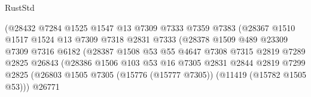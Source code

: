 \begin{lexlean}{RustStd}
\begin{coremodule}
                                    (@28432
                                      @7284
                                      @1525
                                      @1547
                                      @13
                                      @7309
                                      @7333
                                      @7359
                                      @7383
                                      (@28367
                                        @1510
                                        @1517
                                        @1524
                                        @13
                                        @7309
                                        @7318
                                        @2831
                                        @7333
                                        (@28378
                                          @1509
                                          @489
                                          @23309
                                          @7309
                                          @7316
                                          @6182
                                          (@28387
                                            @1508
                                            @53
                                            @55
                                            @4647
                                            @7308
                                            @7315
                                            @2819
                                            @7289
                                            @2825
                                            @26843
                                            (@28386
                                              @1506
                                              @103
                                              @53
                                              @16
                                              @7305
                                              @2831
                                              @2844
                                              @2819
                                              @7299
                                              @2825
                                              (@26803
                                                @1505
                                                @7305
                                                (@15776 (@15777 @7305))
                                                (@11419 (@15782 @1505 @53)))
                                              @26771

\end{coremodule}
\end{lexlean}
